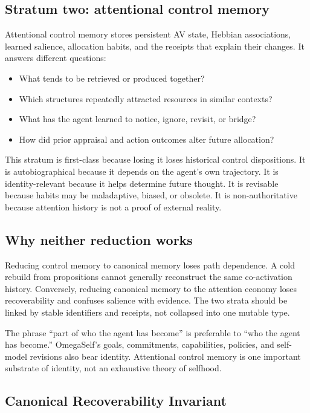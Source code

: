 \documentclass[11pt]{article}
\begin{document}
\subsection{Stratum two: attentional control memory}

Attentional control memory stores persistent AV state, Hebbian associations,
learned salience, allocation habits, and the receipts that explain their
changes.  It answers different questions:
\begin{itemize}
  \item What tends to be retrieved or produced together?
  \item Which structures repeatedly attracted resources in similar contexts?
  \item What has the agent learned to notice, ignore, revisit, or bridge?
  \item How did prior appraisal and action outcomes alter future allocation?
\end{itemize}

This stratum is first-class because losing it loses historical control
dispositions.  It is autobiographical because it depends on the agent's own
trajectory.  It is identity-relevant because it helps determine future thought.
It is revisable because habits may be maladaptive, biased, or obsolete.  It is
non-authoritative because attention history is not a proof of external reality.

\subsection{Why neither reduction works}

Reducing control memory to canonical memory loses path dependence.  A cold
rebuild from propositions cannot generally reconstruct the same co-activation
history.  Conversely, reducing canonical memory to the attention economy loses
recoverability and confuses salience with evidence.  The two strata should be
linked by stable identifiers and receipts, not collapsed into one mutable type.

The phrase ``part of who the agent has become'' is preferable to ``who the
agent has become.''  OmegaSelf's goals, commitments, capabilities, policies,
and self-model revisions also bear identity.  Attentional control memory is one
important substrate of identity, not an exhaustive theory of selfhood.

\subsection{Canonical Recoverability Invariant}
\end{document}
